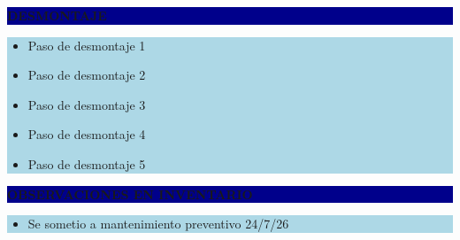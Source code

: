 \documentclass[11pt]{article}
\newcommand{\seccionbanda}[1]{%
  \vspace{0.6em}
  \noindent\colorbox{darkblue}{\parbox{\dimexpr\linewidth-2\fboxsep}{%
    \centering\color{white}\bfseries #1}}\par\vspace{0.6em}
}
\begin{document}
\seccionbanda{DESMONTAJE}
\noindent\colorbox{lightblue}{\parbox{\dimexpr\linewidth-2\fboxsep\relax}{%
\begin{itemize}[label=$\square$, itemsep=4pt]
\item Paso de desmontaje 1
\item Paso de desmontaje 2
\item Paso de desmontaje 3
\item Paso de desmontaje 4
\item Paso de desmontaje 5
\end{itemize}
}}\par
\seccionbanda{OBSERVACIONES EN INVENTARIO}
\noindent\colorbox{lightblue}{\parbox{\dimexpr\linewidth-2\fboxsep\relax}{\begin{itemize}[itemsep=4pt]
\item Se sometio a mantenimiento preventivo 24/7/26
\end{itemize}}}\par
\end{document}
